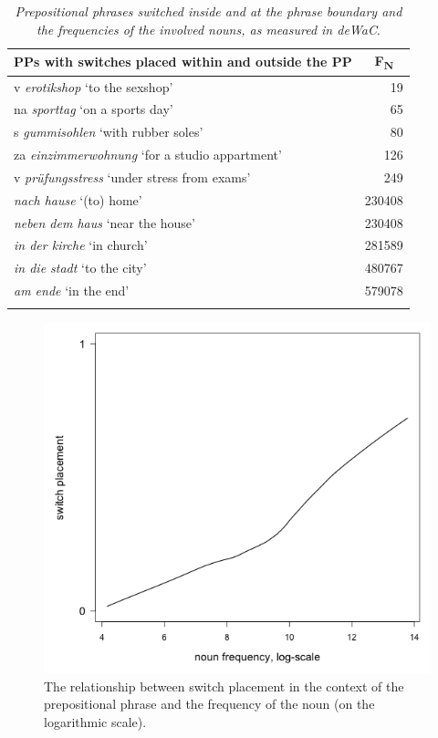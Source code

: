 \begin{table}
\begin{tabular}{lr}
		\lsptoprule
		PPs with switches placed within and outside the PP & \multicolumn{1}{c}{F\textsubscript{N}}\\\midrule
			v \textit{erotikshop} `to the sexshop' & 19\\
			na \textit{sporttag} `on a sports day' & 65\\
			s \textit{gummisohlen} `with rubber soles' & 80\\
			za \textit{einzimmerwohnung} `for a studio appartment' & 126\\
			v \textit{prüfungsstress} `under stress from exams' & 249\\
			\midrule
			\textit{nach hause} `(to) home' & 230408\\
			\textit{neben dem haus} `near the house' & 230408\\
			\textit{in der kirche} `in church' & 281589\\
			\textit{in die stadt} `to the city' & 480767\\
			\textit{am ende} `in the end' & 579078\\
		\lspbottomrule
	\end{tabular}
	\caption{\textit{Prepositional phrases switched inside and at the phrase boundary and the frequencies of the involved nouns, as measured in deWaC}.}\label{tab:5:4}
\end{table}

\begin{figure}
    	\includegraphics[scale=0.5]{figures/5-Figure_3.png}	
		\caption{The relationship between switch placement in the context of the prepositional phrase and the frequency of the noun (on the logarithmic scale).}
	\label{fig:5:3}
\end{figure}

